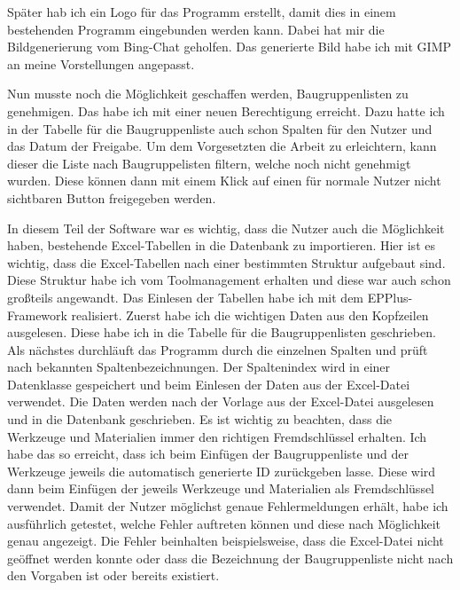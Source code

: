 \documentclass{Vorlage}
\begin{document}
Später hab ich ein Logo für das Programm erstellt, damit dies in einem bestehenden Programm eingebunden werden
kann. Dabei hat mir die Bildgenerierung vom Bing-Chat geholfen. Das generierte Bild habe ich mit GIMP an 
meine Vorstellungen angepasst.

Nun musste noch die Möglichkeit geschaffen werden, Baugruppenlisten zu genehmigen. Das habe ich mit einer 
neuen Berechtigung erreicht. Dazu hatte ich in der Tabelle für die Baugruppenliste auch schon Spalten für 
den Nutzer und das Datum der Freigabe. Um dem Vorgesetzten die Arbeit zu erleichtern, kann dieser die 
Liste nach Baugruppelisten filtern, welche noch nicht genehmigt wurden. Diese können dann mit einem Klick
auf einen für normale Nutzer nicht sichtbaren Button freigegeben werden.

In diesem Teil der Software war es wichtig, dass die Nutzer auch die Möglichkeit haben, bestehende
Excel-Tabellen in die Datenbank zu importieren. Hier ist es wichtig, dass die Excel-Tabellen nach einer 
bestimmten Struktur aufgebaut sind. Diese Struktur habe ich vom Toolmanagement erhalten und diese war auch 
schon großteils angewandt. Das Einlesen der Tabellen habe ich mit dem EPPlus-Framework realisiert. Zuerst
habe ich die wichtigen Daten aus den Kopfzeilen ausgelesen. Diese habe ich in die Tabelle für die 
Baugruppenlisten geschrieben. Als nächstes durchläuft das Programm durch die einzelnen Spalten und prüft
nach bekannten Spaltenbezeichnungen. Der Spaltenindex wird in einer Datenklasse gespeichert und beim 
Einlesen der Daten aus der Excel-Datei verwendet. Die Daten werden nach der Vorlage aus der Excel-Datei
ausgelesen und in die Datenbank geschrieben. Es ist wichtig zu beachten, dass die Werkzeuge und Materialien
immer den richtigen Fremdschlüssel erhalten. Ich habe das so erreicht, dass ich beim Einfügen der Baugruppenliste
und der Werkzeuge jeweils die automatisch generierte ID zurückgeben lasse. Diese wird dann beim Einfügen der
jeweils Werkzeuge und Materialien als Fremdschlüssel verwendet.
Damit der Nutzer möglichst genaue Fehlermeldungen erhält, habe ich ausführlich getestet, welche Fehler
auftreten können und diese nach Möglichkeit genau angezeigt. Die Fehler beinhalten beispielsweise, dass
die Excel-Datei nicht geöffnet werden konnte oder dass die Bezeichnung der Baugruppenliste nicht nach 
den Vorgaben ist oder bereits existiert.
\end{document}
